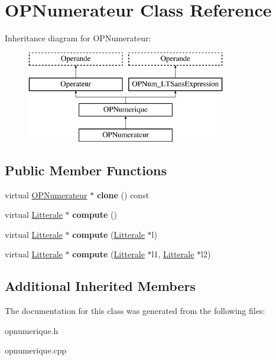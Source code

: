 \hypertarget{class_o_p_numerateur}{}\section{O\+P\+Numerateur Class Reference}
\label{class_o_p_numerateur}
Inheritance diagram for O\+P\+Numerateur\+:\begin{figure}[H]
\begin{center}
\leavevmode
\includegraphics[height=4.000000cm]{class_o_p_numerateur}
\end{center}
\end{figure}
\subsection*{Public Member Functions}
\begin{DoxyCompactItemize}
\item 
virtual \hyperlink{class_o_p_numerateur}{O\+P\+Numerateur} $\ast$ {\bfseries clone} () const \hypertarget{class_o_p_numerateur_a8cb830108d8967edece8eea14e6e736a}{}\label{class_o_p_numerateur_a8cb830108d8967edece8eea14e6e736a}

\item 
virtual \hyperlink{class_litterale}{Litterale} $\ast$ {\bfseries compute} ()\hypertarget{class_o_p_numerateur_a80c2db964bdceab04b37c64d0c1e64ad}{}\label{class_o_p_numerateur_a80c2db964bdceab04b37c64d0c1e64ad}

\item 
virtual \hyperlink{class_litterale}{Litterale} $\ast$ {\bfseries compute} (\hyperlink{class_litterale}{Litterale} $\ast$l)\hypertarget{class_o_p_numerateur_ad3e252d19ce88d5d4ac370fe8a578560}{}\label{class_o_p_numerateur_ad3e252d19ce88d5d4ac370fe8a578560}

\item 
virtual \hyperlink{class_litterale}{Litterale} $\ast$ {\bfseries compute} (\hyperlink{class_litterale}{Litterale} $\ast$l1, \hyperlink{class_litterale}{Litterale} $\ast$l2)\hypertarget{class_o_p_numerateur_ac94ae0e63f1736ddb63e35f07e84db6f}{}\label{class_o_p_numerateur_ac94ae0e63f1736ddb63e35f07e84db6f}

\end{DoxyCompactItemize}
\subsection*{Additional Inherited Members}


The documentation for this class was generated from the following files\+:\begin{DoxyCompactItemize}
\item 
opnumerique.\+h\item 
opnumerique.\+cpp\end{DoxyCompactItemize}
